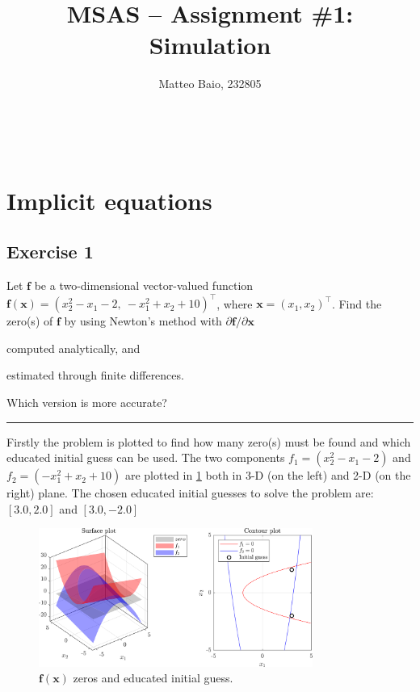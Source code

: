 \documentclass[11pt,a4paper,oneside]{article}
\title{MSAS -- Assignment \#1: Simulation}  %
\author{\large Matteo Baio, 232805}
\date{}
\makeatletter
\renewcommand{\vec}[1]{\mathbf{#1}}
\newcommand\headlinecolor{\normalcolor}
\renewcommand*\maketitle{
    \begingroup
    \centering
    \fontsize{14.4}{14.4}       %
    \selectfont
    \headlinecolor
    \@title\\
    \vspace{5mm}
    \@author
    \par
    \vskip1in
    \endgroup
    \vspace{-22mm}
}
\makeatother
\begin{document}
\maketitle
\thispagestyle{fancy}

\section{Implicit equations}
\subsection{Exercise 1}
Let $\vec{f}$ be a two-dimensional vector-valued function $\vec{f}(\vec{x}) = (x_2^2-x_1-2, \ -x_1^2+x_2+10)^\top$,
where $\vec{x} = (x_1, x_2)^\top$. Find the zero(s) of $\vec{f}$ by using Newton's method with $\partial\vec f/\partial\vec x$ 
\begin{enumerate*}[label=\arabic*)]
    \item computed analytically, and
    \item estimated through finite differences.
\end{enumerate*}
Which version is more accurate?

\medskip
\hrule
\medskip

Firstly the problem is plotted to find how many zero(s) must be found and which educated initial guess can be used.
The two components $f_1=(x_2^2-x_1-2)$ and $f_2=(-x_1^2+x_2+10)$ are plotted in \cref{fig:ex1_initGuess} both in 3-D (on the left) and 2-D (on the right) plane.
The chosen educated initial guesses to solve the problem are: $[3.0,2.0]$ and $[3.0,-2.0]$

\begin{figure}[htb]
    \centering
    \includegraphics*[width=0.8\textwidth, keepaspectratio]{ex1_initGuess.png}
    \caption[]{\label{fig:ex1_initGuess} $\vec{f}(\vec{x})$ zeros and educated initial guess.}
\end{figure}
\end{document}
